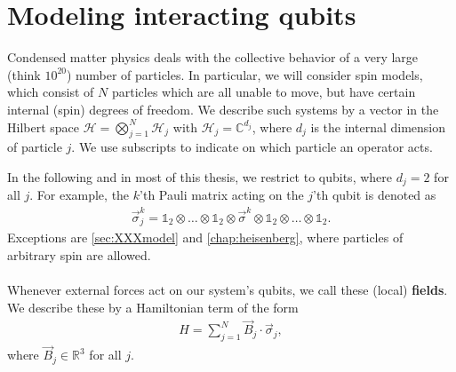 %
%








\section{Modeling interacting qubits}
\label{sec:cmtmodels}
Condensed matter physics deals with the collective behavior of a very large (think $10^{20}$) number of particles. In particular, we will consider spin models, which consist of $N$ particles which are all unable to move, but have certain internal (spin) degrees of freedom. We describe such systems by a vector in the Hilbert space $\mathcal{H} = \bigotimes_{j=1}^{N} \mathcal{H}_j$ with $\mathcal{H}_j = \mathbb{C}^{d_j}$, where $d_j$ is the internal dimension of particle $j$. We use subscripts to indicate on which particle an operator acts.

In the following and in most of this thesis, we restrict to qubits, where $d_j = 2$ for all $j$. For example, the $k$'th Pauli matrix acting on the $j$'th qubit is denoted as
%
\begin{align}
\vec{\sigma}^k_j = \mathds{1}_{2} \otimes \ldots \otimes \mathds{1}_{2} \otimes \vec{\sigma}^k \otimes \mathds{1}_{2} \otimes \ldots \otimes \mathds{1}_{2}.
\end{align}
%
Exceptions are \cref{sec:XXXmodel} and \cref{chap:heisenberg}, where particles of arbitrary spin are allowed. 

\paragraph{} Whenever external forces act on our system's qubits, we call these (local) \textbf{fields}. We describe these by a Hamiltonian term of the form
%
\begin{align}
H = \sum_{j=1}^{N} \vec{B}_j \cdot \vec{\sigma}_j,
\end{align}
%
where $\vec{B}_j \in \mathbb{R}^3$ for all $j$. 

